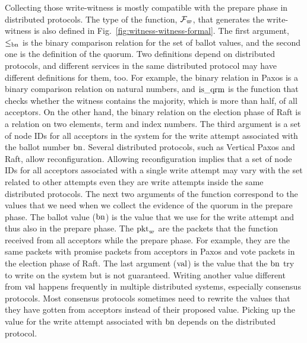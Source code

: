 
Collecting those write-witness is mostly compatible with the prepare phase in distributed protocols. 
The type of the function, $\mathcal{F}_{\varpi}$, that generates the write-witness is also defined in Fig.~\ref{fig:witness-witness-formal}.
The first argument, $ \le_{\mathrm{bn}}$ is the binary comparison relation for the set of ballot values,
and the second one is the definition of the quorum. 
Two definitions depend on distributed protocols, and  different services in the same distributed protocol may have 
different definitions for them, too.
For example, the binary relation in  Paxos is a binary comparison relation on natural numbers, 
and $\mathrm{is}\_\mathrm{qrm}$ is the function that checks whether the witness contains the majority, which is more than half, of all acceptors. 
On the other hand, the binary relation on the election phase of Raft is a relation on two elements, 
term and index numbers. 
The third argument is a set of node IDs for all acceptors in the system for the write attempt associated with the ballot number $\mathrm{bn}$.
Several distributed protocols, such as Vertical Paxos and Raft, allow reconfiguration. 
Allowing reconfiguration implies that a set of node IDs for all acceptors associated with a single write attempt may vary with the set related to other attempts even they are write attempts inside the same distributed protocols.
The next two arguments of the function correspond to the values that we need when we collect the evidence of the quorum in the prepare phase.
The ballot value ($\mathrm{bn}$) is the value that we use for the write attempt and thus also in the prepare phase.
The $\mathrm{pkt}_\varpi$ are the packets that the function received from all acceptors while the prepare phase.
For example, they are the same packets with promise packets from acceptors in Paxos and vote packets in the election phase of Raft. 
The last argument ($\mathrm{val}$) is the value that the $\mathrm{bn}$ try to write on the system but is not guaranteed.
Writing  another value different from $\mathrm{val}$  happens frequently in multiple distributed systems, especially consensus protocols.
Most consensus protocols sometimes need to rewrite the values that they have gotten from acceptors instead of 
their proposed value.
Picking up the value for the write attempt associated with $\mathrm{bn}$ depends on the distributed protocol.


